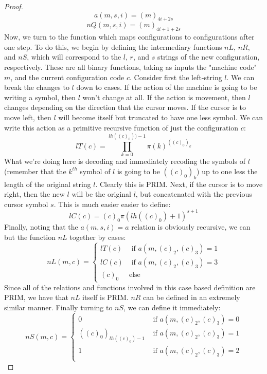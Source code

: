 \begin{proof}
    \[ a(m,s,i) = (m)_{4i+ 2s} \]
    \[ nQ(m,s,i) = (m)_{4i+1+2s} \]
    Now, we turn to the function which maps configurations to configurations after one step. To do this, we begin by defining the intermediary functions $nL$, $nR$, and $nS$, which will correspond to the $l$, $r$, and $s$ strings of the new configuration, respectively. These are all binary functions, taking as inputs the "machine code" $m$, and the current configuration code $c$. Consider first the left-string $l$. We can break the changes to $l$ down to cases. If the action of the machine is going to be writing a symbol, then $l$ won't change at all. If the action is movement, then $l$ changes depending on the direction that the cursor moves. If the cursor is to move left, then $l$ will become itself but truncated to have one less symbol. We can write this action as a primitive recursive function of just the configuration $c$:
    \[ lT(c) = \prod_{k=0}^{lh((c)_0))-1}\pi(k)^{((c)_0)_k}\]
    What we're doing here is decoding and immediately recoding the symbols of $l$ (remember that the $k^{th}$ symbol of $l$ is going to be $((c)_0)_k$) up to one less the length of the original string $l$. Clearly this is PRIM. Next, if the cursor is to move right, then the new $l$ will be the original $l$, but concatenated with the previous cursor symbol $s$. This is much easier easier to define:
    \[ lC(c) = (c)_0\pi(lh((c)_0)+1)^{s+1} \]
    Finally, noting that the $a(m,s,i) = a$ relation is obviously recursive, we can but the function $nL$ together by cases:
    \[ nL(m,c) = \begin{cases}
               lT(c) & \textrm{ if $a(m,(c)_2,(c)_3) = 1$} \\
               lC(c) & \textrm{ if $a(m,(c)_2,(c)_3) = 3$} \\
               (c)_0 & \textrm{else}
            \end{cases} \]
    Since all of the relations and functions involved in this case based definition are PRIM, we have that $nL$ itself is PRIM. $nR$ can be defined in an extremely similar manner. Finally turning to $nS$, we can define it immediately:
    \[ nS(m,c) = \begin{cases}
                    0 & \textrm{ if $a(m,(c)_2,(c)_3) = 0$} \\
                    ((c)_0)_{lh((c)_0)-1} & \textrm{ if $a(m,(c)_2,(c)_3) = 1$} \\
                    1 & \textrm{ if $a(m,(c)_2,(c)_3) = 2$} \\

\end{cases}\]
\end{proof}
